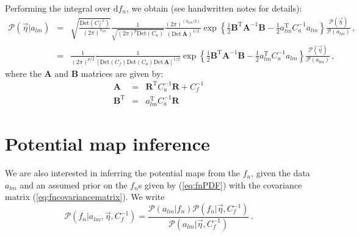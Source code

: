 \documentclass[prd, onecolumn, floatfix, letterpaper, nofootinbib, amsmath, amssymb, superscriptaddress]{revtex4}
\renewcommand{\(}{\left(}
\renewcommand{\)}{\right)}
\renewcommand{\[}{\left[}
\renewcommand{\]}{\right]}
\def\be{\begin{equation}}
\def\ee{\end{equation}}
\def\bea{\begin{eqnarray}}
\def\eea{\end{eqnarray}}
\newcommand{\Mp}{M_{_\mathrm{Pl}}}
\begin{document}
\bigskip

Performing the integral over $\mathrm{d}f_n$, we obtain (see handwritten notes for details):
\bea
	\mathcal{P}(\vec{\eta}| a_{lm} )&=&\sqrt{\frac{\mathrm{Det}(C_f^{-1})}{(2\pi)^{n_{tot}}}}\frac{1}{\sqrt{(2\pi)^{p}\mathrm{Det}(C_a)}} \frac{(2\pi)^{(n_{tot}/2)}}{(\mathrm{Det}\,\mathbf{A})^{1/2}}\exp\left\{\frac{1}{2}\mathbf{B}^{\mathrm{T}}\mathbf{A}^{-1}\mathbf{B}-\frac{1}{2}a^{\mathrm{T}}_{lm}C_a^{-1}a_{lm} \right\}\frac{\mathcal{P}(\vec{\eta})}{\mathcal{P}(a_{lm})}\, , \\
	&=&\frac{1}{(2\pi)^{p/2}} \frac{1}{\left[\mathrm{Det}(C_f)\mathrm{Det}(C_a)\mathrm{Det}\,\mathbf{A}\right]^{1/2}}\exp\left\{\frac{1}{2}\mathbf{B}^{\mathrm{T}}\mathbf{A}^{-1}\mathbf{B}-\frac{1}{2}a^{\mathrm{T}}_{lm}C_a^{-1}a_{lm} \right\}\frac{\mathcal{P}(\vec{\eta})}{\mathcal{P}(a_{lm})}\, ,
\eea
where the $\mathbf{A}$ and $\mathbf{B}$ matrices are given by:
\bea
	\mathbf{A}~~&=&\mathbf{R}^{\mathrm{T}}C^{-1}_a \mathbf{R}+C_f^{-1}\\
	 \mathbf{B}^{\mathrm{T}}&=&a_{lm}^{\mathrm{T}}C_a^{-1}\mathbf{R}
\eea

\section{Potential map inference}
We are also interested in inferring the potential maps from the $f_n$, given the data $a_{lm}$ and an assumed prior on the $f_n$s given by (\ref{eq:fnPDF}) with the covariance matrix (\ref{eq:fncovariancematrix}). We write
\be
	\mathcal{P}(f_n | a_{lm}, \vec{\eta}, C_f^{-1})=\frac{\mathcal{P}(a_{lm}|f_n) \mathcal{P}(f_n|  \vec{\eta}, C_f^{-1})}{\mathcal{P}(a_{lm}| \vec{\eta}, C_f^{-1})}\, .
\ee
\end{document}

